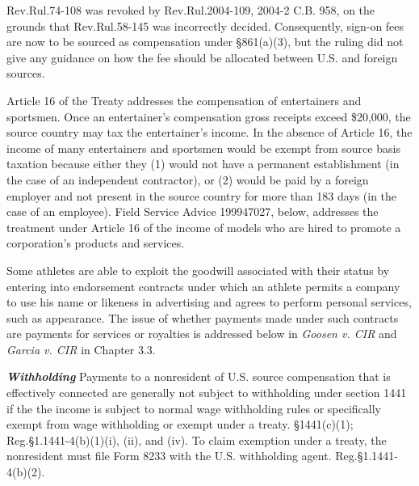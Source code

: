 Rev.\@ Rul.\@ 74-108 was revoked by Rev.\@ Rul.\@ 2004-109, 2004-2 C.B. 958, on the grounds that Rev.\@ Rul.\@ 58-145 was incorrectly decided.  Consequently, sign-on fees are now to be sourced as compensation under \S861(a)(3), but the ruling did not give any guidance on how the fee should be allocated between U.S. and foreign sources.     

Article 16 of the Treaty addresses the compensation of entertainers and sportsmen.  Once an entertainer's compensation gross receipts exceed \$20,000, the source country may tax the entertainer's income.  In the absence of Article 16, the income of many entertainers and sportsmen would be exempt from source basis taxation because either they (1) would not have a permanent establishment (in the case of an independent contractor), or (2) would be paid by a foreign employer and not present in the source country for more than 183 days (in the case of an employee).  Field Service Advice 199947027, below, addresses the treatment under Article 16 of the income of models who are hired to promote a corporation's products and services.    

 Some athletes are able to exploit the goodwill associated with their status by entering into endorsement contracts under which an athlete permits a company to use his name or likeness in advertising and agrees to perform personal services, such as appearance.  The issue of whether payments made under such contracts are payments for services or royalties is addressed below in \emph{Goosen v. CIR} and \emph{Garcia v. CIR} in Chapter 3.3.
 
 

\textbf{\emph{Withholding}} Payments to a nonresident of U.S. source compensation that is effectively connected are generally not subject to withholding under section 1441 if the the income is subject to normal wage withholding rules or specifically exempt from wage withholding or exempt under a treaty.  \S1441(c)(1); Reg.\@ \S 1.1441-4(b)(1)(i), (ii), and (iv).  To claim exemption under a treaty, the nonresident must file Form 8233 with the U.S. withholding agent.  Reg.\@ \S 1.1441-4(b)(2).


